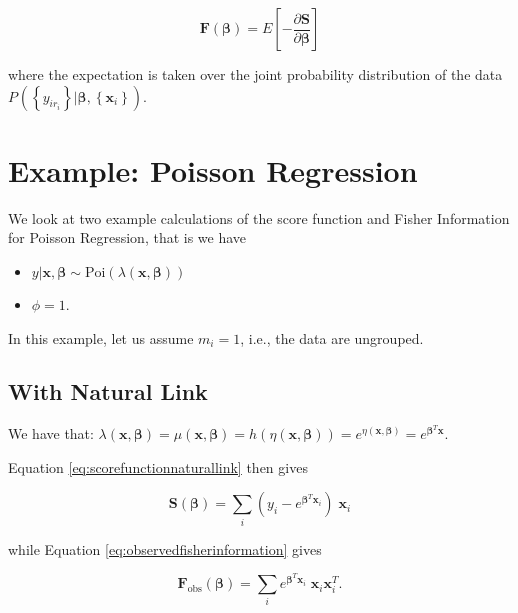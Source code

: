 \documentclass[
  12pt,
]{book}
\providecommand{\tightlist}{%
  \setlength{\itemsep}{0pt}\setlength{\parskip}{0pt}}
\begin{document}
\begin{equation}
  \boldsymbol{F}(\boldsymbol{\beta}) = E \left[ - \frac{\partial \boldsymbol{S} }{ \partial \boldsymbol{\beta}} \right]
  \label{eq:fisherinformation}
\end{equation}

where the expectation is taken over the joint probability distribution of the data \(P_{}\left(\left\{y_{ir_{i}}\right\} |\boldsymbol{\beta}, \left\{\boldsymbol{x}_{i}\right\}\right)\).

\section{Example: Poisson Regression}\label{example-poisson-regression}

We look at two example calculations of the score function and Fisher Information for Poisson Regression, that is we have

\begin{itemize}
\tightlist
\item
  \(y |\boldsymbol{x}, \boldsymbol{\beta} \sim \text{Poi}(\lambda(\boldsymbol{x}, \boldsymbol{\beta}))\)
\item
  \(\phi = 1\).
\end{itemize}

In this example, let us assume \(m_i = 1\), i.e., the data are ungrouped.

\subsection{With Natural Link}\label{with-natural-link}

We have that:
\(\lambda(\boldsymbol{x}, \boldsymbol{\beta}) = \mu(\boldsymbol{x}, \boldsymbol{\beta}) = h(\eta(\boldsymbol{x}, \boldsymbol{\beta})) = e^{\eta(\boldsymbol{x}, \boldsymbol{\beta})} = e^{\boldsymbol{\beta}^T\boldsymbol{x}}\).

Equation \eqref{eq:scorefunctionnaturallink} then gives

\begin{equation}
  \boldsymbol{S}(\boldsymbol{\beta}) = \sum_{i} (y_{i} - e^{\boldsymbol{\beta}^{T}\boldsymbol{x}_{i}})\;\boldsymbol{x}_{i}
\end{equation}

while Equation \eqref{eq:observedfisherinformation} gives

\begin{equation}
  \boldsymbol{F}_{\text{obs}}(\boldsymbol{\beta}) = \sum_{i} e^{\boldsymbol{\beta}^{T}\boldsymbol{x}_{i}}\;\boldsymbol{x}_{i}\boldsymbol{x}_{i}^{T}.
\end{equation}
\end{document}
